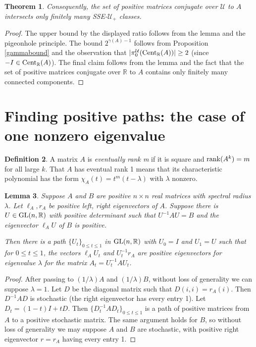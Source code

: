 \documentclass{amsart}
\newtheorem{theorem}{Theorem}[section]
\newtheorem{lemma}[theorem]{Lemma}
\theoremstyle{definition}
\newtheorem{definition}[theorem]{Definition}
\theoremstyle{remark}
\newcommand{\za}{\textnormal{Cent}_{\mathbb R}(A)}
\numberwithin{equation}{section}
\begin{document}
{{\begin{theorem}
Consequently, the set of positive matrices 
conjugate over $\mathcal U$ to $A$ intersects 
only finitely many SSE-$\mathcal U_+$ classes. 
\end{theorem} 

\begin{proof} 
The upper bound by the displayed ratio follows from 
the lemma and the pigeonhole principle. The bound 
$2^{\gamma(A)-1}$ follows from 
Proposition \ref{gammabound} and the observation that 
$|\pi_0^{\mathcal U}(\za)|\geq 2$ (since 
$-I\in  \textnormal{Cent}_{\mathbb R} (A) $).
The final claim follows from the lemma and the 
fact that the set of positive matrices conjugate 
over $\mathbb R$ to $A$ contains only finitely 
many connected components. 
\end{proof} 

\section{Finding positive paths: the case of one nonzero eigenvalue} 
\label{findingsec}

\begin{definition} 
A matrix $A$ is {\it eventually rank m} if it is square and 
$\textnormal{rank}(A^k)=m$ for all large $k$.  That $A$ has eventual rank 
1 means that its 
characteristic polynomial has the form $\chi_A(t)=t^m(t-\lambda )$ 
with $\lambda$ nonzero. 
\end{definition} 

\begin{lemma} \label{positivepath1} 
Suppose $A$ and $B$ are positive $n\times n$ 
real matrices with spectral radius $\lambda $. 
Let $\ell_A , r_A$ be  positive left, right 
eigenvectors of $A$. Suppose 
 there is 
$U\in \textnormal{GL}(n,\mathbb R)$ with positive determinant 
such that 
$U^{-1}AU=B$ and 
the eigenvector $\ell_AU$ of $B$ 
is positive. 

 Then there is a path $\{U_t\}_{0\leq t\leq 1}$ 
in $\textnormal{GL}(n, \mathbb R )$ with $U_0=I$ and $U_1=U$ 
such that for $0\leq t \leq 1$,
the 
vectors 
$\ell_AU_t$ and $U_t^{-1}r_A$ 
are positive eigenvectors 
for  eigenvalue $\lambda$ 
for the matrix 
$A_t=U_t^{-1}AU_t$.

\end{lemma} 

\begin{proof} 
After passing to $(1/\lambda)A $ and $(1/\lambda)B$, 
without loss of generality we can suppose $\lambda=1$. 
Let $D$ be the diagonal matrix such that $D(i,i)=r_A(i)$. 
Then $D^{-1}AD$ is stochastic (the right eigenvector has 
every entry 1). Let  $D_t= (1-t)I + tD$. Then  
$\{ D_t^{-1}AD_t\}_{0\leq t\leq 1}$  is a path of positive 
matrices from $A$ 
to a positive stochastic matrix. The same argument  holds for $B$, 
so without loss of generality 
 we may suppose $A$ and $B$ are stochastic, with positive 
right eigenvector $r=r_A$ having every entry 1. 



\end{proof}}}
\end{document}
